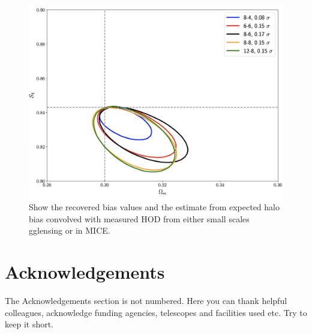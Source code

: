 \documentclass[fleqn,usenatbib]{mnras}
\begin{document}
\begin{figure}
\includegraphics[width=\columnwidth,draft]{figs/temp.png}
\caption[]{Show the recovered bias values and the estimate from expected halo bias convolved with measured HOD from either small scales gglensing or in MICE. }
\label{fig:bias_relation}
\end{figure}


\section*{Acknowledgements}

The Acknowledgements section is not numbered. Here you can thank helpful
colleagues, acknowledge funding agencies, telescopes and facilities used etc.
Try to keep it short.







\end{document}
